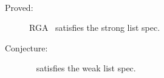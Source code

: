 \begin{frame}{}

  \vspace{0.30cm}
  \begin{center}
     \\[6pt]
  \end{center}

  \pause
  \vspace{0.30cm}
  \begin{center}
    \begin{minipage}{0.70\textwidth}
      \begin{description}
	\item[Proved:] RGA~\cite{Roh:JPDC11} satisfies the strong list spec.
	\item[Conjecture:] \textsl{}~\cite{Nichols:UIST95} satisfies the weak list spec.
      \end{description}
    \end{minipage}
  \end{center}
\end{frame}
